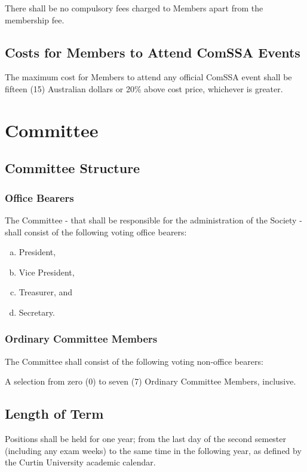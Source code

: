 \documentclass[a4paper,12pt]{article}
\begin{document}
There shall be no compulsory fees charged to Members apart from the membership fee.

\subsection{Costs for Members to Attend ComSSA Events}

The maximum cost for Members to attend any official ComSSA event shall be fifteen (15) Australian dollars or 20\% above cost price, whichever is greater.

\section{Committee}

\subsection{Committee Structure}

\subsubsection{Office Bearers}
\label{office_bearers}

The Committee  - that shall be responsible for the administration of the Society - shall consist of the following voting office bearers:

\begin{enumerate}[a)]
	\item President,
	\item Vice President,
	\item Treasurer, and
	\item Secretary.
\end{enumerate}

\subsubsection{Ordinary Committee Members}

The Committee shall consist of the following voting non-office bearers:

A selection from zero (0) to seven (7) Ordinary Committee Members, inclusive.

\subsection{Length of Term}

Positions shall be held for one year; from the last day of the second semester (including any exam weeks) to the same time in the following year, as defined by the Curtin University academic calendar.
\end{document}
